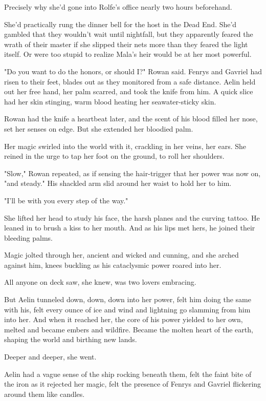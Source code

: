 Precisely why she'd gone into Rolfe's office nearly two hours beforehand.

She'd practically rung the dinner bell for the host in the Dead End.
She'd gambled that they wouldn't wait until nightfall, but they apparently feared the wrath of their master if she slipped their nets more than they feared the light itself.
Or were too stupid to realize Mala's heir would be at her most powerful.

"Do you want to do the honors, or should I?"
Rowan said.
Fenrys and Gavriel had risen to their feet, blades out as they monitored from a safe distance.
Aelin held out her free hand, her palm scarred, and took the knife from him.
A quick slice had her skin stinging, warm blood heating her seawater-sticky skin.

Rowan had the knife a heartbeat later, and the scent of his blood filled her nose, set her senses on edge.
But she extended her bloodied palm.

Her magic swirled into the world with it, crackling in her veins, her ears.
She reined in the urge to tap her foot on the ground, to roll her shoulders.

"Slow," Rowan repeated, as if sensing the hair-trigger that her power was now on, "and steady."
His shackled arm slid around her waist to hold her to him.

"I'll be with you every step of the way."

She lifted her head to study his face, the harsh planes and the curving tattoo.
He leaned in to brush a kiss to her mouth.
And as his lips met hers, he joined their bleeding palms.

Magic jolted through her, ancient and wicked and cunning, and she arched against him, knees buckling as his cataclysmic power roared into her.

All anyone on deck saw, she knew, was two lovers embracing.

But Aelin tunneled down, down, down into her power, felt him doing the same with his, felt every ounce of ice and wind and lightning go slamming from him into her.
And when it reached her, the core of his power yielded to her own, melted and became embers and wildfire.
Became the molten heart of the earth, shaping the world and birthing new lands.

Deeper and deeper, she went.

Aelin had a vague sense of the ship rocking beneath them, felt the faint bite of the iron as it rejected her magic, felt the presence of Fenrys and Gavriel flickering around them like candles.

